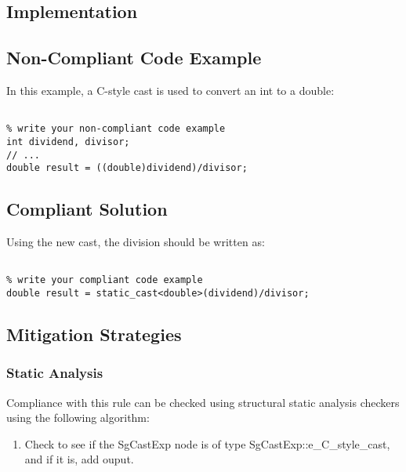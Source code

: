 \subsection{Implementation}


\subsection{Non-Compliant Code Example}

In this example, a C-style cast is used to convert an int to a double:

\begin{verbatim}

% write your non-compliant code example
int dividend, divisor;
// ...
double result = ((double)dividend)/divisor;

\end{verbatim}

\subsection{Compliant Solution}

Using the new cast, the division should be written as:

\begin{verbatim}

% write your compliant code example
double result = static_cast<double>(dividend)/divisor;

\end{verbatim}

\subsection{Mitigation Strategies}
\subsubsection{Static Analysis} 

Compliance with this rule can be checked using structural static analysis checkers using the following algorithm:

\begin{enumerate}
\item Check to see if the SgCastExp node is of type
SgCastExp::e\_C\_style\_cast, and if it is, add ouput.
\end{enumerate}

